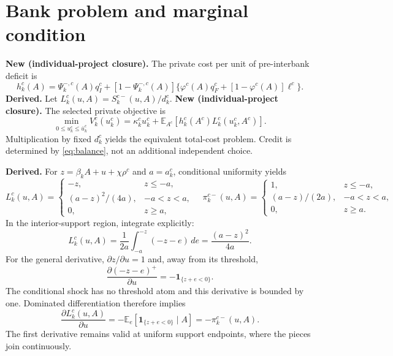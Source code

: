 \documentclass[11pt,a4paper]{article}
\newcommand{\E}{\mathbb E}
\newcommand{\ind}{\mathbf 1}
\newcommand{\newa}{\textbf{New (individual-project closure).}}
\newcommand{\der}{\textbf{Derived.}}
\begin{document}
\section{Bank problem and marginal condition}
\newa{} The private cost per unit of pre-interbank deficit is
\begin{equation}\label{eq:h}
 h_k^c(A)=\Psi_k^{-,c}(A)q_I^c+
 [1-\Psi_k^{-,c}(A)]\{\varphi^c(A)q_F^c+[1-\varphi^c(A)]\ell^c\}.
\end{equation}
\der{} Let $L_k^c(u,A)=S_k^{c-}(u,A)/d_k^c$.
\newa{} The selected private objective is
\begin{equation}\label{eq:problem}
 \min_{0\leq u_k^c\leq\bar u_k^c}
 V_k^c(u_k^c)=\kappa_k^cu_k^c+
 \E_{A^c}[h_k^c(A^c)L_k^c(u_k^c,A^c)].
\end{equation}
Multiplication by fixed $d_k^c$ yields the equivalent total-cost problem. Credit is determined by \eqref{eq:balance}, not an additional independent choice.

\der{} For $z=\beta_kA+u+\chi\rho^c$ and $a=a_k^c$, conditional uniformity yields
\begin{equation}\label{eq:uniform}
 L_k^c(u,A)=\begin{cases}
 -z,&z\leq-a,\\
 (a-z)^2/(4a),&-a<z<a,\\
 0,&z\geq a,
 \end{cases}\quad
 \pi_k^{c-}(u,A)=\begin{cases}
 1,&z\leq-a,\\
 (a-z)/(2a),&-a<z<a,\\
 0,&z\geq a.
 \end{cases}
\end{equation}
In the interior-support region, integrate explicitly:
\begin{equation}
 L_k^c(u,A)=\frac1{2a}\int_{-a}^{-z}(-z-e)\,de
 =\frac{(a-z)^2}{4a}.
\end{equation}
For the general derivative, $\partial z/\partial u=1$ and, away from its threshold,
\begin{equation}
 \frac{\partial(-z-e)^+}{\partial u}=-\ind_{\{z+e<0\}}.
\end{equation}
The conditional shock has no threshold atom and this derivative is bounded by one. Dominated differentiation therefore implies
\begin{equation}\label{eq:derivative}
 \frac{\partial L_k^c(u,A)}{\partial u}
 =-\E_e[\ind_{\{z+e<0\}}\mid A]=-\pi_k^{c-}(u,A).
\end{equation}
The first derivative remains valid at uniform support endpoints, where the pieces join continuously.
\end{document}
